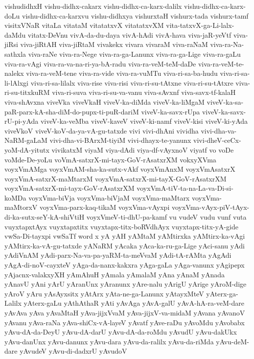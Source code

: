 {vishudidhxH
vishu-didhx-cakarx
vishu-didhx-ca-karx-dalilx
vishu-didhx-ca-karx-doLu
vishu-didhx-ca-karxvu
vishu-didhxya
vishurxtaH
vishurx-tada
vishurx-tamf
visitxVNaR
vitaLa
vitataM
vitatatxvX
vitatatxvXM
vita-tatxvX-ga-Li-lalx-daMdu
vitatx-DeVnu
vivA-da-du-daya
vivA-hAdi
vivA-hava
viva-jaR-yeVtf
viva-jiRsi
viva-jiRtAH
viva-jiRtaM
vivakekx
vivara
vivaraM
viva-raNaM
viva-ra-Na-sathxla
viva-raNe
viva-ra-Nege
viva-ra-ga-Lanunx
viva-ra-ga-Lige
viva-ra-gaLu
viva-ra-vAgi
viva-ra-va-na-ri-ya-bA-radu
viva-ra-veM-teM-daDe
viva-ra-veM-te-nalekx
viva-ra-veM-tene
viva-ra-vide
viva-ra-vuMTu
viva-ri-sa-ba-hudu
viva-ri-sa-li-lAlxgi
viva-ri-sa-lilalx
viva-rise
viva-risi
viva-ri-su-tAtxne
viva-ri-su-tAtxre
viva-ri-su-titxkuRM
viva-ri-suva
viva-ri-su-va-vanu
viva-sAvxnf
viva-savx-tf-kalaH
viva-shAvxna
viveVka
viveVkaH
viveV-ka-diMda
viveV-ka-liMgaM
viveV-ka-sa-paR-parx-kA-sha-diM-do-pupx-ti-puR-dariM
viveV-ka-savx-rUpa
viveV-ka-savx-rU-pi-yAda
viveV-ka-veMba
viveV-kaveV
viveV-ki-namf
viveV-kisi
viveV-ki-yAda
viveVkoV
viveV-koV-da-ya-vA-gu-tatxde
vivi
vivi-dhAni
vividha
vivi-dha-va-NaRM-gaLaM
vivi-dha-vi-BArxM-tiyiM
vivi-dhayx-te-yanunx
vivi-dheV-ceCx-yoM-dA-yitutx
vivikatxM
viyaM
viya-dAdi
viya-df-vAyxnoV
viyatf
vo
voDe
voMde-De-yoLu
voVmA-satxrX-mi-tayx-GoV-rAsatxrXM
vokxyXVma
voyxVmAMga
voyxVmAM-sha-ka-sutx-vAkf
voyxVmAnxM
voyxVmAsatxrX
voyxVmA-satxrX-maMtarxM
voyxVmA-satxrX-mi-tayX-GoV-rAsatxrXM
voyxVmA-satxrX-mi-tayx-GoV-rAsatxrXM
voyxVmA-tiV-ta-na-La-va-Di-si-koMDa
voyxVma-biVja
voyxVma-biVjaM
voyxVma-maMtarx
voyxVma-maMtorxV
voyxVma-parx-kaq-tikaM
voyxVma-vAyxpi
voyxVma-vAyx-piV-tAyx-di-ka-sutx-seY-kA-shiVtiH
voyxVmeV-ti-dhU-pa-kamf
vu
vudeV
vudu
vunf
vuta
vuyxtapxtAyx
vuyxtapxtitx
vuyxtapx-titx-boRVdhAyx
vuyxtapx-titx-yA-gide
vwSa-Di-tayxpi
vwSaTf
word
x
yA
yAH
yAMtaM
yAMtirxka
yAMtirx-ka-vAgi
yAMtirx-ka-vA-gu-tatxde
yANaRM
yAcaka
yAca-ka-ru-ga-Lige
yAci-sanu
yAdi
yAdiVnAM
yAdi-parx-Na-va-pa-yaRM-ta-meVvaM
yAdi-tA-rAMta
yAgAdi
yAgA-di-noV-cayxteV
yAga-da-nanx-kakxra
yAga-gaLa
yAga-vanunx
yAgipepx
yAjacnx-valakxyXH
yAmAhuH
yAmala
yAmalaM
yAna
yAnaM
yAnada
yAnavU
yAni
yArU
yAranUnx
yAranunx
yAre-nalu
yArigU
yArige
yAroM-dige
yAroV
yAru
yAsAyxsitx
yAtArx
yAta-ne-ga-Lanunx
yAtayxMteV
yAterx-ga-Lalilx
yAterx-gaLu
yAthAthaR
yAti
yAvAga
yAvA-galU
yAvA-hA-ra-veM-dare
yAvAva
yAva
yAvaMtaH
yAva-jijxVvaM
yAva-jijxV-va-midaM
yAvana
yAvanoV
yAvanu
yAva-raNa
yAva-shiCx-vA-layeV
yAvatf
yAve-raDu
yAvoMdu
yAvobabx
yAvu-dA-da-DeyU
yAvu-dA-darU
yAvu-dA-da-roMdu
yAvudU
yAvu-dakUkx
yAvu-danUnx
yAvu-danunx
yAvu-dara
yAvu-da-ralilx
yAvu-da-riMda
yAvu-deM-dare
yAvudeV
yAvu-di-dadxrU
yAvudoV
}
